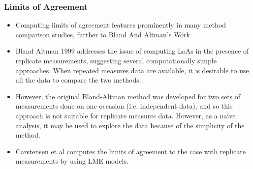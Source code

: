 \documentclass[compress]{beamer}        %
\begin{document}
\begin{frame}
\frametitle{Limits of Agreement }
\begin{itemize}
\item Computing limits of agreement features prominently in many method comparison studies, further to Bland And Altman's Work
\item Bland Altman 1999 addresses the issue of computing LoAs in the presence of replicate measurements, suggesting several computationally simple approaches. When repeated measures data are available, it is desirable to use
all the data to compare the two methods. 
\item However, the original Bland-Altman method was developed for two sets of measurements done on one occasion (i.e. independent data), and so this approach is not suitable for replicate measures data. However, as a naive analysis, it may be used to explore the data because of the simplicity of the method.
\item Carstensen et al computes the limits of agreement to the case with replicate measurements by using LME models.
\end{itemize}
\end{frame}











\end{document}
